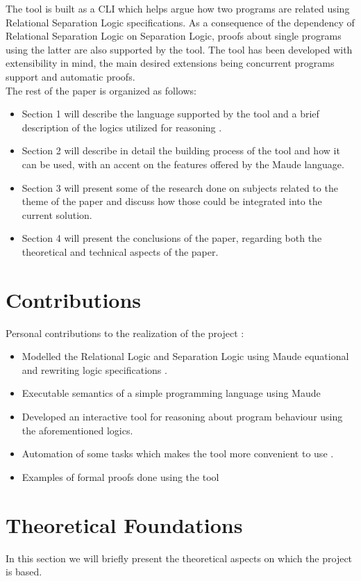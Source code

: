 \documentclass[12pt,a4paper]{article}
\begin{document}
The tool is built as a CLI which helps \cite{primer} \cite{SeparationLogic} \cite{JAVAITP} \cite{REWRITING} \cite{maudeprimer} \cite{manual} \cite{rewrConcurrency} \cite{cyclist} argue how two programs are related using Relational Separation Logic specifications. As a consequence of the dependency of Relational Separation Logic on Separation Logic, proofs about single programs using the latter are also supported by the tool. The tool has been developed with extensibility in mind, the main desired extensions being concurrent programs support and automatic proofs. \\

The rest of the paper is organized as follows: 
\begin{itemize}
	\item Section 1 will describe the language supported by the tool and a brief description of the logics utilized for reasoning .
	\item Section 2 will describe in detail the building process of the tool and how it can be used, with an accent on the features offered by the Maude language.
	\item Section 3 will present some of the research done on subjects related to the theme of the paper and discuss how those could be integrated into the current solution.
	\item Section 4 will present the conclusions of the paper, regarding both the theoretical and technical aspects of the paper.
\end{itemize}


\section{Contributions}
Personal contributions to the realization of the project : 
\begin{itemize}
	\item Modelled the Relational Logic and Separation Logic using Maude equational and rewriting logic specifications . 
	\item Executable semantics of a simple programming language using Maude
	\item Developed an interactive tool for reasoning about program behaviour using the aforementioned logics.
	\item Automation of some tasks which makes the tool more convenient to use .
	\item Examples of formal proofs done using the tool
\end{itemize}
\section{Theoretical Foundations}
In this section we will briefly present the theoretical aspects on which the project is based. 
\end{document}
